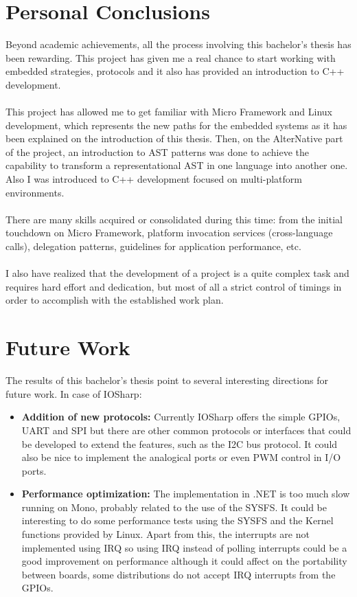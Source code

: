 \section{Personal Conclusions}\label{S:Personal-Conclusions}
Beyond academic achievements, all the process involving this bachelor's thesis has been rewarding. This project has given me a real chance to start working with embedded strategies, protocols and it also has provided an introduction to C++ development.
\\
\\
This project has allowed me to get familiar with Micro Framework and Linux development, which represents the new paths for the embedded systems as it has been explained on the introduction of this thesis. Then, on the AlterNative part of the project, an introduction to AST patterns was done to achieve the capability to transform a representational AST in one language into another one. Also I was introduced to C++ development focused on multi-platform environments.
\\
\\
There are many skills acquired or consolidated during this time: from the initial touchdown on Micro Framework, platform invocation services (cross-language calls), delegation patterns, guidelines for application performance, etc.
\\
\\
I also have realized that the development of a project is a quite complex task and requires hard effort and dedication, but most of all a strict control of timings in order to accomplish with the established work plan.

\section{Future Work}\label{S:Future-Work}
The results of this bachelor's thesis point to several interesting directions for future work.
In case of IOSharp:
\begin{itemize}
\item \textbf{Addition of new protocols:} Currently IOSharp offers the simple GPIOs, UART and SPI but there are other common protocols or interfaces that could be developed to extend the features, such as the \gls{I2C} bus protocol. It could also be nice to implement the analogical ports or even \gls{PWM} control in I/O ports.

\item \textbf{Performance optimization:} The implementation in .NET is too much slow running on Mono, probably related to the use of the \gls{SYSFS}. It could be interesting to do some performance tests using the \gls{SYSFS} and the Kernel functions provided by Linux. Apart from this, the interrupts are not implemented using \gls{IRQ} so using \gls{IRQ} instead of polling interrupts could be a good improvement on performance although it could affect on the portability between boards, some distributions do not accept IRQ interrupts from the GPIOs.
\end{itemize}


